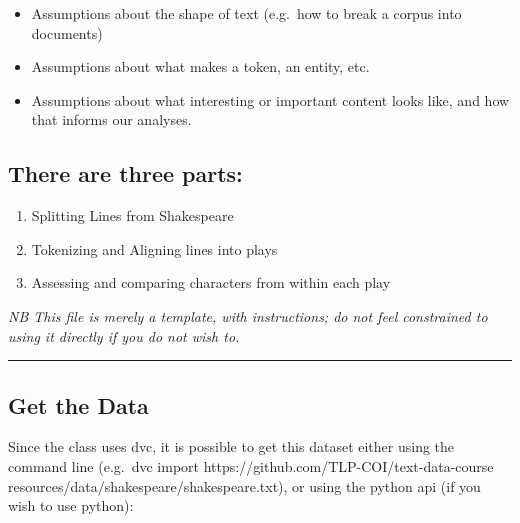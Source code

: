 \documentclass[11pt]{article}
\providecommand{\tightlist}{%
      \setlength{\itemsep}{0pt}\setlength{\parskip}{0pt}}
\begin{document}
\begin{itemize}
\tightlist
\item
  Assumptions about the shape of text (e.g.~how to break a corpus into
  documents)
\item
  Assumptions about what makes a token, an entity, etc.
\item
  Assumptions about what interesting or important content looks like,
  and how that informs our analyses.
\end{itemize}

\hypertarget{there-are-three-parts}{%
\subsection{There are three parts:}\label{there-are-three-parts}}

\begin{enumerate}
\def\labelenumi{\arabic{enumi}.}
\tightlist
\item
  Splitting Lines from Shakespeare
\item
  Tokenizing and Aligning lines into plays
\item
  Assessing and comparing characters from within each play
\end{enumerate}

\emph{NB This file is merely a template, with instructions; do not feel
constrained to using it directly if you do not wish to.}

\begin{center}\rule{0.5\linewidth}{0.5pt}\end{center}

    \hypertarget{get-the-data}{%
\subsection{Get the Data}\label{get-the-data}}

Since the class uses dvc, it is possible to get this dataset either
using the command line (e.g.~dvc import
https://github.com/TLP-COI/text-data-course
resources/data/shakespeare/shakespeare.txt), or using the python api (if
you wish to use python):
\end{document}
